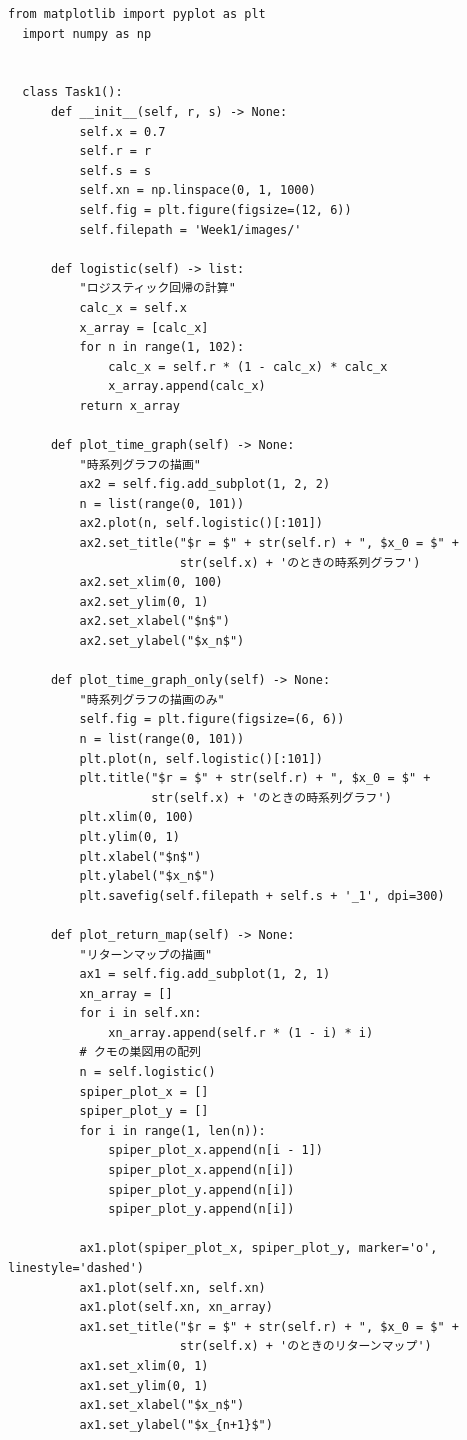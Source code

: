 \begin{lstlisting}[caption=week1.py]
  from matplotlib import pyplot as plt
  import numpy as np
  
  
  class Task1():
      def __init__(self, r, s) -> None:
          self.x = 0.7
          self.r = r
          self.s = s
          self.xn = np.linspace(0, 1, 1000)
          self.fig = plt.figure(figsize=(12, 6))
          self.filepath = 'Week1/images/'
  
      def logistic(self) -> list:
          "ロジスティック回帰の計算"
          calc_x = self.x
          x_array = [calc_x]
          for n in range(1, 102):
              calc_x = self.r * (1 - calc_x) * calc_x
              x_array.append(calc_x)
          return x_array
  
      def plot_time_graph(self) -> None:
          "時系列グラフの描画"
          ax2 = self.fig.add_subplot(1, 2, 2)
          n = list(range(0, 101))
          ax2.plot(n, self.logistic()[:101])
          ax2.set_title("$r = $" + str(self.r) + ", $x_0 = $" +
                        str(self.x) + 'のときの時系列グラフ')
          ax2.set_xlim(0, 100)
          ax2.set_ylim(0, 1)
          ax2.set_xlabel("$n$")
          ax2.set_ylabel("$x_n$")
  
      def plot_time_graph_only(self) -> None:
          "時系列グラフの描画のみ"
          self.fig = plt.figure(figsize=(6, 6))
          n = list(range(0, 101))
          plt.plot(n, self.logistic()[:101])
          plt.title("$r = $" + str(self.r) + ", $x_0 = $" +
                    str(self.x) + 'のときの時系列グラフ')
          plt.xlim(0, 100)
          plt.ylim(0, 1)
          plt.xlabel("$n$")
          plt.ylabel("$x_n$")
          plt.savefig(self.filepath + self.s + '_1', dpi=300)
  
      def plot_return_map(self) -> None:
          "リターンマップの描画"
          ax1 = self.fig.add_subplot(1, 2, 1)
          xn_array = []
          for i in self.xn:
              xn_array.append(self.r * (1 - i) * i)
          # クモの巣図用の配列
          n = self.logistic()
          spiper_plot_x = []
          spiper_plot_y = []
          for i in range(1, len(n)):
              spiper_plot_x.append(n[i - 1])
              spiper_plot_x.append(n[i])
              spiper_plot_y.append(n[i])
              spiper_plot_y.append(n[i])
  
          ax1.plot(spiper_plot_x, spiper_plot_y, marker='o', linestyle='dashed')
          ax1.plot(self.xn, self.xn)
          ax1.plot(self.xn, xn_array)
          ax1.set_title("$r = $" + str(self.r) + ", $x_0 = $" +
                        str(self.x) + 'のときのリターンマップ')
          ax1.set_xlim(0, 1)
          ax1.set_ylim(0, 1)
          ax1.set_xlabel("$x_n$")
          ax1.set_ylabel("$x_{n+1}$")
  

\end{lstlisting}
